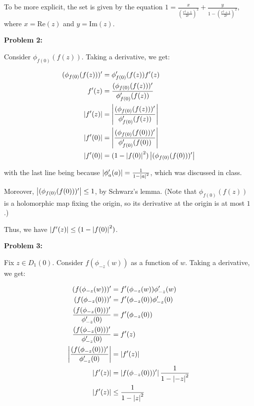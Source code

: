 \documentclass[a4paper,12pt]{article}
\begin{document}
To be more explicit, the set is given by the equation $1= \frac{x}{(\frac{r^2+1}{2r})^2} + \frac{y}{1- (\frac{r^2+1}{2r})^2}$, where $x = \text{Re}(z)$ and $y = \text{Im}(z)$.

\shunt

{\bf Problem 2:}

Consider $\phi_{f(0)}(f(z))$. Taking a derivative, we get:

\begin{align*}
(\phi_{f(0)}(f(z)))' &= \phi_{f(0)}'(f(z))f'(z)\\
f'(z) &= \frac{(\phi_{f(0)}(f(z)))'}{\phi_{f(0)}'(f(z))}\\
\left\lvert f'(z) \right\rvert &= \left\lvert \frac{(\phi_{f(0)}(f(z)))'}{\phi_{f(0)}'(f(z))} \right\rvert\\
\left\lvert f'(0) \right\rvert &= \left\lvert \frac{(\phi_{f(0)}(f(0)))'}{\phi_{f(0)}'(f(0))} \right\rvert\\
\left\lvert f'(0) \right\rvert &= (1-\left\lvert f(0) \right\rvert^2)\left\lvert (\phi_{f(0)}(f(0)))' \right\rvert\\
\end{align*}

with the last line being because $\left\lvert \phi_{a}'(a) \right\rvert = \frac{1}{1-\left\lvert a \right\rvert^2}$, which was discussed in class.

Moreover, $\left\lvert (\phi_{f(0)}(f(0)))' \right\rvert \leq 1$, by Schwarz's lemma. (Note that $\phi_{f(0)}(f(z))$ is a holomorphic map fixing the origin, so its derivative at the origin is at most $1$.)

Thus, we have $\left\lvert f'(z) \right\rvert \leq (1-\left\lvert f(0) \right\rvert^2)$.

\shunt

{\bf Problem 3:}

Fix $z \in D_1(0)$. Consider $f(\phi_{-z}(w))$ as a function of $w$. Taking a derivative, we get: 

\begin{align*}
(f(\phi_{-z}(w)))' &= f'(\phi_{-z}(w))\phi_{-z}'(w)\\
(f(\phi_{-z}(0)))' &= f'(\phi_{-z}(0))\phi_{-z}'(0)\\
\frac{(f(\phi_{-z}(0)))'}{\phi_{-z}'(0)} &= f'(\phi_{-z}(0))\\
\frac{(f(\phi_{-z}(0)))'}{\phi_{-z}'(0)} &= f'(z)\\
\left\lvert \frac{(f(\phi_{-z}(0)))'}{\phi_{-z}'(0)} \right\rvert &= \left\lvert f'(z) \right\rvert\\
\left\lvert f'(z) \right\rvert&= \left\lvert f(\phi_{-z}(0)))' \right\rvert \frac{1}{1-\left\lvert -z \right\rvert^2}\\
\left\lvert f'(z) \right\rvert&\leq \frac{1}{1-\left\lvert z \right\rvert^2}\\
\end{align*}
\end{document}
